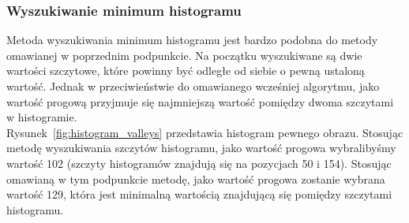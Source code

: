 \subsubsection{Wyszukiwanie minimum histogramu}
Metoda wyszukiwania minimum histogramu jest bardzo podobna do metody omawianej w poprzednim podpunkcie. Na początku wyszukiwane są dwie wartości szczytowe, które powinny być odległe od siebie o pewną ustaloną wartość. Jednak w przeciwieństwie do omawianego wcześniej algorytmu, jako wartość progową przyjmuje się najmniejszą wartość pomiędzy dwoma szczytami w histogramie. \\
Rysunek~\ref{fig:histogram_valleys} przedstawia histogram pewnego obrazu. Stosując metodę wyszukiwania szczytów histogramu, jako wartość progowa wybralibyśmy wartość 102 (szczyty histogramów znajdują się na pozycjach 50 i 154). Stosując omawianą w tym podpunkcie metodę, jako wartość progowa zostanie wybrana wartość 129, która jest minimalną wartością znajdującą się pomiędzy szczytami histogramu.

